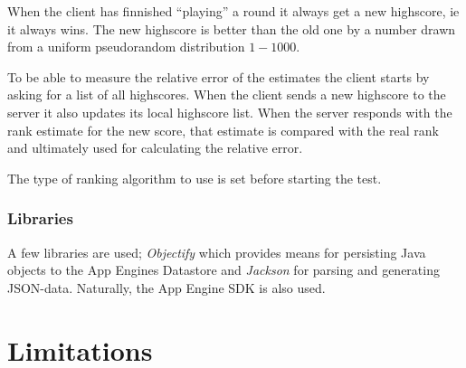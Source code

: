 When the client has finnished ``playing'' a round it always get a new highscore, ie it always wins. The new highscore is better than the old one by a number drawn from a uniform pseudorandom distribution $1-1000$.

To be able to measure the relative error of the estimates the client starts by asking for a list of all highscores. When the client sends a new highscore to the server it also updates its local highscore list. When the server responds with the rank estimate for the new score, that estimate is compared with the real rank and ultimately used for calculating the relative error.

The type of ranking algorithm to use is set before starting the test.


\subsubsection{Libraries}

A few libraries are used; \emph{Objectify} which provides means for persisting Java objects to the App Engines Datastore
and \emph{Jackson} for parsing and generating JSON-data. Naturally, the App Engine SDK is also used.


\section{Limitations}




